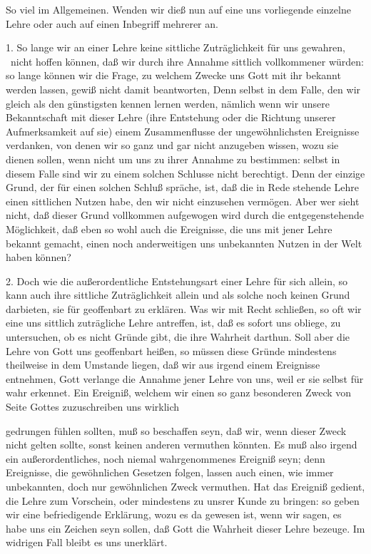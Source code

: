 So viel im Allgemeinen. Wenden wir dieß nun auf eine uns vorliegende einzelne Lehre oder auch auf einen Inbegriff mehrerer an. \par
1. So lange wir an einer Lehre keine sittliche Zuträglichkeit für uns gewahren, \dh\  nicht hoffen können, daß wir durch ihre Annahme sittlich vollkommener würden: so lange können wir die Frage, zu welchem Zwecke uns Gott mit ihr bekannt werden lassen, gewiß nicht damit beantworten,  Denn selbst in dem Falle, den wir gleich als den günstigsten kennen lernen werden, nämlich wenn wir unsere Bekanntschaft mit dieser Lehre (ihre Entstehung oder die Richtung unserer Aufmerksamkeit auf sie) einem Zusammenflusse der ungewöhnlichsten Ereignisse verdanken, von denen wir so ganz und gar nicht anzugeben wissen, wozu sie dienen sollen, wenn nicht um uns zu ihrer  Annahme zu bestimmen: selbst in diesem Falle sind wir zu einem solchen Schlusse nicht berechtigt. Denn der einzige Grund, der für einen solchen Schluß spräche, ist, daß die in Rede stehende Lehre einen sittlichen Nutzen habe, den wir nicht einzusehen vermögen. Aber wer sieht nicht, daß dieser Grund vollkommen aufgewogen wird durch die entgegenstehende Möglichkeit, daß eben so wohl auch die Ereignisse, die uns  mit jener Lehre bekannt gemacht, einen noch anderweitigen uns unbekannten Nutzen in der Welt haben können? \par
2. Doch wie die außerordentliche Entstehungsart einer Lehre für sich allein, so kann auch ihre sittliche Zuträglichkeit allein und als solche noch keinen Grund darbieten, sie für geoffenbart zu erklären. Was wir mit Recht schließen, so oft wir eine uns sittlich zuträgliche Lehre antreffen, ist, daß es sofort uns obliege, zu untersuchen, ob es nicht Gründe gibt, die ihre Wahrheit darthun. Soll aber die Lehre von Gott uns geoffenbart heißen, so müssen diese Gründe mindestens theilweise in dem Umstande liegen, daß wir aus irgend einem Ereignisse entnehmen, Gott verlange die  Annahme jener Lehre von uns, weil er sie selbst für wahr erkennet. Ein Ereigniß, welchem wir einen so ganz besonderen Zweck von Seite Gottes zuzuschreiben uns wirklich \par
gedrungen fühlen sollten, muß so beschaffen seyn, daß wir, wenn dieser Zweck nicht gelten sollte, sonst keinen anderen vermuthen könnten. Es muß also irgend ein außerordentliches, noch niemal wahrgenommenes Ereigniß seyn; denn Ereignisse, die gewöhnlichen Gesetzen folgen, lassen auch einen, wie immer unbekannten, doch nur gewöhnlichen Zweck vermuthen. Hat das Ereigniß gedient, die Lehre zum Vorschein, oder mindestens zu unsrer Kunde zu bringen: so geben wir eine befriedigende Erklärung, wozu es da gewesen ist, wenn wir sagen, es habe uns ein Zeichen seyn sollen, daß Gott die Wahrheit dieser Lehre bezeuge. Im widrigen Fall bleibt es uns unerklärt. \par
